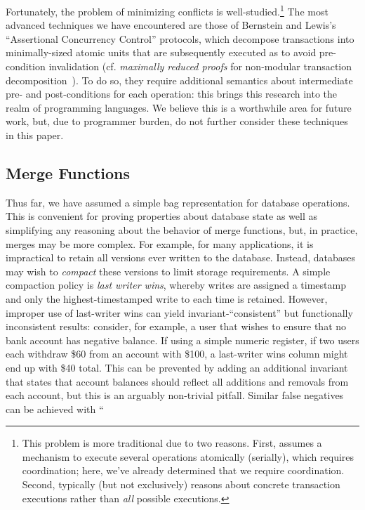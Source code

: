 Fortunately, the problem of minimizing conflicts is
well-studied.\footnote{This problem is more traditional due to two
  reasons. First, assumes a mechanism to execute several operations
  atomically (serially), which requires coordination; here, we've
  already determined that we require coordination. Second, typically
  (but not exclusively) reasons about concrete transaction executions
  rather than \textit{all} possible executions.} The most advanced
techniques we have encountered are those of Bernstein and Lewis's
``Assertional Concurrency Control'' protocols, which decompose
transactions into minimally-sized atomic units that are subsequently
executed as to avoid pre-condition invalidation (cf. \textit{maximally
  reduced proofs} for non-modular transaction
decomposition~\cite{decomp-semantics}). To do so, they require
additional semantics about intermediate pre- and post-conditions for
each operation: this brings this research into the realm of
programming languages. We believe this is a worthwhile area for future
work, but, due to programmer burden, do not further consider these
techniques in this paper.

\subsection{Merge Functions}

Thus far, we have assumed a simple bag representation for database
operations. This is convenient for proving properties about database
state as well as simplifying any reasoning about the behavior of merge
functions, but, in practice, merges may be more complex. For example,
for many applications, it is impractical to retain all versions ever
written to the database. Instead, databases may wish to
\textit{compact} these versions to limit storage requirements. A
simple compaction policy is \textit{last writer wins}, whereby writes
are assigned a timestamp and only the highest-timestamped write to
each time is retained. However, improper use of last-writer wins can
yield invariant-``consistent'' but functionally inconsistent results:
consider, for example, a user that wishes to ensure that no bank
account has negative balance. If using a simple numeric register, if
two users each withdraw \$60 from an account with \$100, a last-writer
wins column might end up with \$40 total. This can be prevented by
adding an additional invariant that states that account balances
should reflect all additions and removals from each account, but this
is an arguably non-trivial pitfall. Similar false negatives can be
achieved with ``


